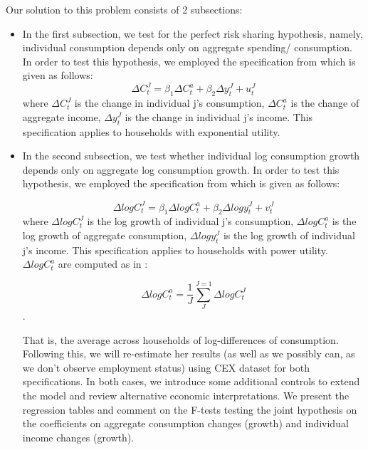 \documentclass[12pt,a4paper]{article}
\begin{document}
Our solution to this problem consists of 2 subsections:
\begin{itemize}
    \item In the first subsection, we test for the perfect risk sharing hypothesis, namely, individual consumption depends only on aggregate spending/ consumption. In order to test this hypothesis, we employed the specification from \citealp{mace1991} which is given as follows:
\begin{equation}\label{one}
      \Delta C_t^J =\beta_1 \Delta C_t^a + \beta_2 \Delta y_t^J + u_t^J
\end{equation}
where $\Delta C_t^J$ is the change in individual j's consumption, $\Delta C_t^a$ is the change of aggregate income, $\Delta y_t^J$ is the change in individual j's income. This specification applies to households with exponential utility.

\item In the second subsection, we test whether individual log consumption growth depends only on aggregate log consumption growth. In order to test this hypothesis, we employed the specification from \citealp{mace1991} which is given as follows:

\begin{equation}\label{two}
      \Delta log  C_t^J =\beta_1 \Delta log C_t^a + \beta_2 \Delta log y_t^J + v_t^J
\end{equation}
where   $\Delta log  C_t^J$ is the log growth of individual j's consumption,   $  \Delta log  C_t^a$ is the log growth of aggregate consumption,  $ \Delta log y_t^J$ is the log growth of  individual j's income. This specification applies to households with power utility. \\

$\Delta log  C_t^a$ are computed as in \citealp{mace1991}:

\begin{equation}\label{two}
      \Delta log  C_t^a = \frac{1}{J} \sum_{J}^{J=1} \Delta log  C_t^J
\end{equation}.

That is, the average across households of log-differences of consumption. \\

Following this, we will re-estimate her results (as well as we possibly can, as we don’t observe employment status) using CEX dataset for both specifications. In both cases, we introduce some additional controls to extend the model and review alternative economic interpretations. We present the regression tables and comment on the F-tests testing the joint hypothesis on the coefficients on aggregate consumption changes (growth) and individual income changes (growth).
\end{itemize}
\end{document}
